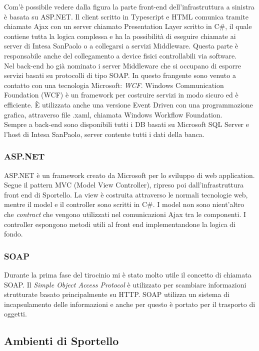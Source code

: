 Com'è possibile vedere dalla figura la parte front-end dell'infrastruttura a sinistra è basata su ASP.NET. Il client scritto in Typescript e HTML comunica tramite chiamate Ajax con un server chiamato Presentation Layer scritto in C\#, il quale contiene tutta la logica complessa e ha la possibilità di eseguire chiamate ai server di Intesa SanPaolo o a collegarsi a servizi Middleware. Questa parte è responsabile anche del collegamento a device fisici controllabili via software. \\
Nel back-end ho già nominato i server Middleware che si occupano di esporre servizi basati su protocolli di tipo SOAP. In questo frangente sono venuto a contatto con una tecnologia Microsoft: \textit{WCF}. Windows Communication Foundation (WCF) è un framework per costruire servizi in modo sicuro ed è efficiente. È utilizzata anche una versione Event Driven con una programmazione grafica, attraverso file .xaml, chiamata Windows Workflow Foundation. \\
Sempre a back-end sono disponibili tutti i DB basati su Microsoft SQL Server e l'host di Intesa SanPaolo, server contente tutti i dati della banca. \\

\subsubsection{ASP.NET}
ASP.NET è un framework creato da Microsoft per lo sviluppo di web application. Segue il pattern MVC (Model View Controller), ripreso poi dall'infrastruttura front end di Sportello. La view è costruita attraverso le normali tecnologie web, mentre il model e il controller sono scritti in C\#. I model non sono nient'altro che \textit{contract} che vengono utilizzati nel comunicazioni Ajax tra le componenti. I controller espongono metodi utili al front end implementandone la logica di fondo.  

\subsubsection{SOAP}
Durante la prima fase del tirocinio mi è stato molto utile il concetto di chiamata SOAP. Il \textit{Simple Object Access Protocol} è utilizzato per scambiare informazioni strutturate basato principalmente su HTTP. SOAP utilizza un sistema di incapsulamento delle informazioni e anche per questo è portato per il trasporto di oggetti.

\subsection{Ambienti di Sportello}

